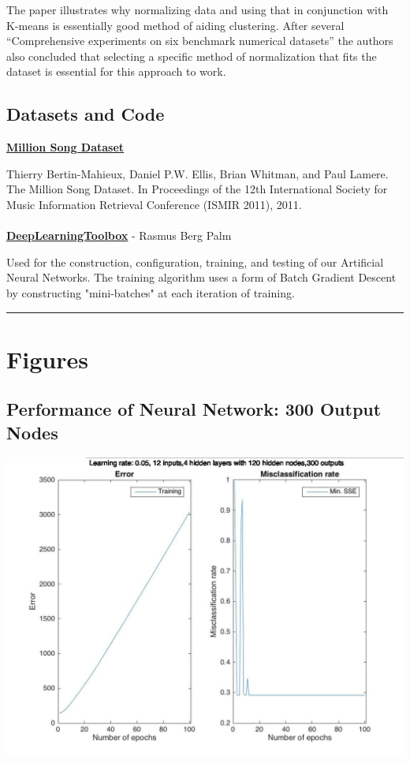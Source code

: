 \documentclass[12pt]{article}
\newcommand{\horizontalLine}{
	\begin{center}
		\hrule width 1.0\textwidth
	\end{center}
}
\begin{document}
The paper illustrates why normalizing data and using that in conjunction with K-means is essentially good method of aiding clustering. After several ``Comprehensive experiments on six benchmark numerical datasets'' the authors also concluded that selecting a specific method of normalization that fits the dataset is essential for this approach to work.

\subsection{Datasets and Code}
\label{subsec:datasetsAndCode}
\href{http://labrosa.ee.columbia.edu/millionsong/}{\textbf{Million Song Dataset}}

Thierry Bertin-Mahieux, Daniel P.W. Ellis, Brian Whitman, and Paul Lamere. 
The Million Song Dataset. In Proceedings of the 12th International Society
for Music Information Retrieval Conference (ISMIR 2011), 2011.
\\
\\
\href{https://github.com/rasmusbergpalm/DeepLearnToolbox}{\textbf{DeepLearningToolbox}} - Rasmus Berg Palm

Used for the construction, configuration, training, and testing of our Artificial Neural Networks. The training algorithm uses a form of Batch Gradient Descent by constructing "mini-batches" at each iteration of training.

\appendix

\horizontalLine
\section{Figures}
\label{sec:figures}

\subsection{Performance of Neural Network: 300 Output Nodes}
\label{subsec:annPoorPerformance}
\includegraphics[scale=0.45]{images/ann/horribleResultsWIth300Outputs}
\end{document}
